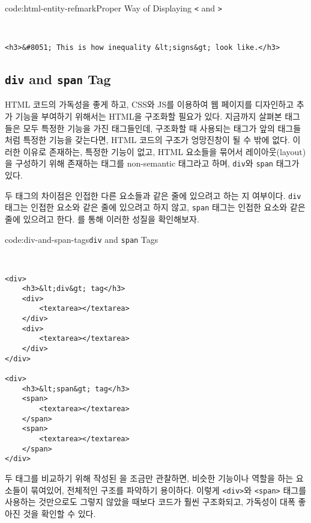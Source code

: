 \begin{codeenv}{code:html-entity-refmark}{Proper Way of Displaying \texttt{<} and \texttt{>}}\begin{verbatim}


<h3>&#8051; This is how inequality &lt;signs&gt; look like.</h3>
\end{verbatim}
\end{codeenv}

\subsection*{\texttt{div} and \texttt{span} Tag}
HTML 코드의 가독성을 좋게 하고, CSS와 JS를 이용하여 웹 페이지를 디자인하고 추가 기능을 부여하기 위해서는 HTML을 구조화할 필요가 있다. 지금까지 살펴본 태그들은 모두 특정한 기능을 가진 태그들인데, 구조화할 때 사용되는 태그가 앞의 태그들처럼 특정한 기능을 갖는다면, HTML 코드의 구조가 엉망진창이 될 수 밖에 없다. 이러한 이유로 존재하는, 특정한 기능이 없고, HTML 요소들을 묶어서 레이아웃(layout)을 구성하기 위해 존재하는 태그를 non-semantic 태그라고 하며, \verb|div|와 \verb|span| 태그가 있다. 

두 태그의 차이점은 인접한 다른 요소들과 같은 줄에 있으려고 하는 지 여부이다. \verb|div| 태그는 인접한 요소와 같은 줄에 있으려고 하지 않고, \verb|span| 태그는 인접한 요소와 같은 줄에 있으려고 한다. 를 통해 이러한 성질을 확인해보자.

\begin{codeenv}{code:div-and-span-tags}{\texttt{div} and \texttt{span} Tags}\begin{verbatim}


<div>
    <h3>&lt;div&gt; tag</h3>
    <div>
        <textarea></textarea>
    </div>
    <div>
        <textarea></textarea>
    </div>
</div>

<div>
    <h3>&lt;span&gt; tag</h3>
    <span>
        <textarea></textarea>
    </span>
    <span>
        <textarea></textarea>
    </span>
</div>
\end{verbatim}
\end{codeenv}

두 태그를 비교하기 위해 작성된 을 조금만 관찰하면, 비슷한 기능이나 역할을 하는 요소들이 묶여있어, 전체적인 구조를 파악하기 용이하다. 이렇게 \texttt{<div>}와 \texttt{<span>} 태그를 사용하는 것만으로도 그렇지 않았을 때보다 코드가 훨씬 구조화되고, 가독성이 대폭 좋아진 것을 확인할 수 있다. 
